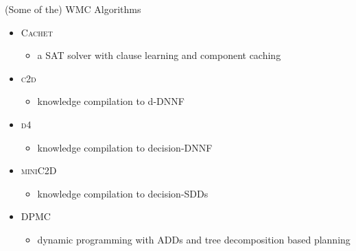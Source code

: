 \documentclass{beamer}
\begin{document}
\begin{frame}{(Some of the) WMC Algorithms}
  \begin{itemize}
    \item \textsc{Cachet} \textcolor{gray}{\parencite{DBLP:conf/sat/SangBBKP04}}
          \begin{itemize}
            \item a SAT solver with \alert{clause learning} and \alert{component
                  caching}
          \end{itemize}
    \item \textsc{c2d} \textcolor{gray}{\parencite{DBLP:conf/ecai/Darwiche04}}
          \begin{itemize}
            \item knowledge compilation to \alert{d-DNNF}
          \end{itemize}
    \item \textsc{d4} \textcolor{gray}{\parencite{DBLP:conf/ijcai/LagniezM17}}
          \begin{itemize}
            \item knowledge compilation to \alert{decision-DNNF}
          \end{itemize}
    \item \textsc{miniC2D} \textcolor{gray}{\parencite{DBLP:conf/ijcai/OztokD15}}
          \begin{itemize}
            \item knowledge compilation to \alert{decision-SDDs}
          \end{itemize}
    \item \textsc{DPMC} \textcolor{gray}{\parencite{DBLP:conf/cp/DudekPV20}}
          \begin{itemize}
            \item dynamic programming with \alert{ADDs} and \alert{tree
                  decomposition} based planning
          \end{itemize}
  \end{itemize}
\end{frame}
\end{document}
